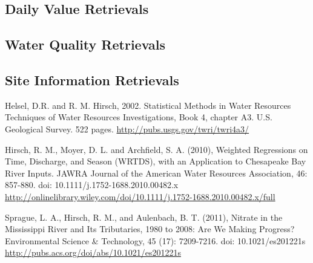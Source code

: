 \documentclass[a4paper,11pt]{article}
\begin{document}
\subsection{Daily Value Retrievals}


\subsection{Water Quality Retrievals}


\subsection{Site Information Retrievals}



\newpage

\begin{thebibliography}{10}

Helsel, D.R. and R. M. Hirsch, 2002. Statistical Methods in Water Resources Techniques of Water Resources Investigations, Book 4, chapter A3. U.S. Geological Survey. 522 pages. \url{http://pubs.usgs.gov/twri/twri4a3/}

Hirsch, R. M., Moyer, D. L. and Archfield, S. A. (2010), Weighted Regressions on Time, Discharge, and Season (WRTDS), with an Application to Chesapeake Bay River Inputs. JAWRA Journal of the American Water Resources Association, 46: 857-880. doi: 10.1111/j.1752-1688.2010.00482.x \url{http://onlinelibrary.wiley.com/doi/10.1111/j.1752-1688.2010.00482.x/full}

Sprague, L. A., Hirsch, R. M., and Aulenbach, B. T. (2011), Nitrate in the Mississippi River and Its Tributaries, 1980 to 2008: Are We Making Progress? Environmental Science \& Technology, 45 (17): 7209-7216. doi: 10.1021/es201221s \url{http://pubs.acs.org/doi/abs/10.1021/es201221s}

\end{thebibliography}
\end{document}
